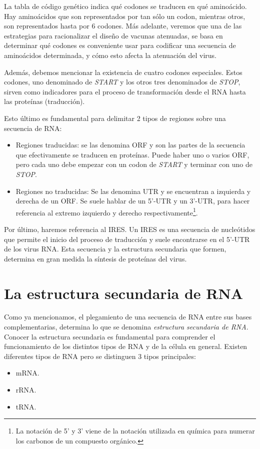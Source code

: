 La tabla de c\'odigo gen\'etico indica qu\'e codones se traducen en qu\'e
amino\'acido. Hay amino\'acidos que son representados por tan s\'olo un codon,
mientras otros, son representados hasta por 6 codones. M\'as adelante, veremos
que una de las estrategias para racionalizar el dise\~no de vacunas atenuadas,
se basa en determinar qu\'e codones es conveniente usar para codificar una
secuencia de amino\'acidos determinada, y c\'omo esto afecta la atenuaci\'on del
virus.

Adem\'as, debemos mencionar la existencia de cuatro codones especiales. Estos
codones, uno denominado de \textit{START} y los otros tres denominados de
\textit{STOP}, sirven como indicadores para el proceso de transformaci\'on desde
el \ac{RNA} hasta las prote\'inas (traducci\'on).

Esto \'ultimo es fundamental para delimitar 2 tipos de regiones sobre una
secuencia de \ac{RNA}:
\begin{itemize}
 \item Regiones traducidas: se las denomina \ac{ORF} y son las partes de la
secuencia que efectivamente se traducen en prote\'inas. Puede haber uno o varios
\ac{ORF}, pero cada uno debe empezar con un codon de \textit{START} y terminar
con uno de \textit{STOP}.
 \item Regiones no traducidas: Se las denomina \ac{UTR} y se encuentran a
izquierda y derecha de un \ac{ORF}. Se suele hablar de un 5'-\ac{UTR} y un
3'-\ac{UTR}, para hacer referencia al extremo izquierdo y derecho
respectivamente\footnote{La notaci\'on de 5' y 3' viene de la notaci\'on
utilizada en qu\'imica para numerar los carbonos de un compuesto org\'anico.}.
\end{itemize}

Por \'ultimo, haremos referencia al \ac{IRES}. Un \ac{IRES} es una secuencia de
nucle\'otidos que permite el inicio del proceso de traducci\'on y suele
encontrarse en el 5'-\ac{UTR} de los virus \ac{RNA}. Esta secuencia y la
estructura secundaria que formen, determina en gran medida la s\'intesis de
prote\'inas del virus.

\section{La estructura secundaria de \ac{RNA}}
\label{estructura}
Como ya mencionamos, el plegamiento de una secuencia de \ac{RNA} entre sus bases
complementarias, determina lo que se denomina \textit{estructura secundaria de
\ac{RNA}}. Conocer la estructura secundaria es fundamental para comprender el
funcionamiento de los distintos tipos de \ac{RNA} y de la c\'elula en general.
Existen diferentes tipos de \ac{RNA} pero se distinguen 3 tipos principales: 
\begin{itemize}
 \item \ac{mRNA}.
 \item \ac{rRNA}.
 \item \ac{tRNA}. 
\end{itemize}


